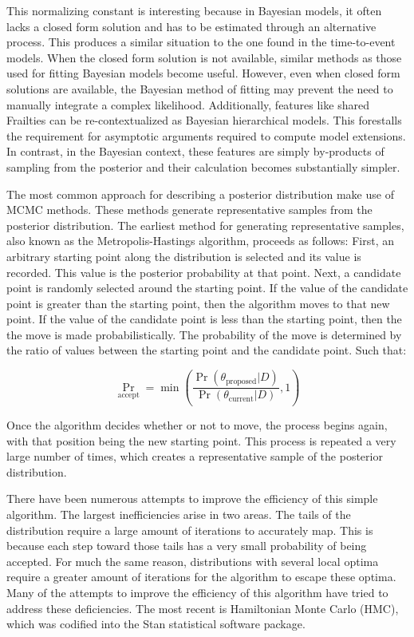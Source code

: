 This normalizing constant is interesting because in Bayesian models, it often lacks a closed form solution and has to be estimated through an alternative process. This produces a similar situation to the one found in the time-to-event models. When the closed form solution is not available, similar methods as those used for fitting Bayesian models become useful. However, even when closed form solutions are available, the Bayesian method of fitting may prevent the need to manually integrate a complex likelihood. Additionally, features like shared Frailties can be re-contextualized as Bayesian hierarchical models. This forestalls the requirement for asymptotic arguments required to compute model extensions. In contrast, in the Bayesian context, these features are simply by-products of sampling from the posterior and their calculation becomes substantially simpler\cite{Ibrahim2005}. 

The most common approach for describing a posterior distribution make use of MCMC methods. These methods generate representative samples from the posterior distribution. The earliest method for generating representative samples, also known as the Metropolis-Hastings algorithm\cite{Metropolis1953}, proceeds as follows: First, an arbitrary starting point along the distribution is selected and its value is recorded. This value is the posterior probability at that point. Next, a candidate point is randomly selected around the starting point. If the value of the candidate point is greater than the starting point, then the algorithm moves to that new point. If the value of the candidate point is less than the starting point, then the the move is made probabilistically. The probability of the move is determined by the ratio of values between the starting point and the candidate point. Such that:

$$ \Pr_{\text{accept}} = \min\left (\frac{\Pr(\theta_{\text{proposed}}|D)}{\Pr(\theta_{\text{current}}|D)} , 1 \right )$$

Once the algorithm decides whether or not to move, the process begins again, with that position being the new starting point. This process is repeated a very large number of times, which creates a representative sample of the posterior distribution.

There have been numerous attempts to improve the efficiency of this simple algorithm. The largest inefficiencies arise in two areas. The tails of the distribution require a large amount of iterations to accurately map. This is because each step toward those tails has a very small probability of being accepted. For much the same reason, distributions with several local optima require a greater amount of iterations for the algorithm to escape these optima. Many of the attempts to improve the efficiency of this algorithm have tried to address these deficiencies. The most recent is Hamiltonian Monte Carlo (HMC), which was codified into the Stan statistical software package\cite{Carpenter2016}. 

